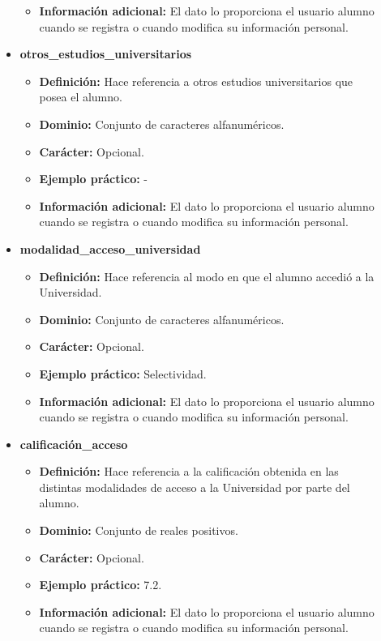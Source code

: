 \begin{description}
\begin{itemize}
\begin{itemize}
         \item \textbf{Información adicional:} El dato lo proporciona el usuario alumno cuando se registra o cuando modifica su información personal.
      \end{itemize}
   \item \textbf{otros\_estudios\_universitarios}
      \begin{itemize}
         \item \textbf{Definición:} Hace referencia a otros estudios universitarios que posea el alumno.
         \item \textbf{Dominio:} Conjunto de caracteres alfanuméricos.
         \item \textbf{Carácter:}  Opcional.
         \item \textbf{Ejemplo práctico:} -
         \item \textbf{Información adicional:} El dato lo proporciona el usuario alumno cuando se registra o cuando modifica su información personal.
      \end{itemize}
   \item \textbf{modalidad\_acceso\_universidad}
      \begin{itemize}
         \item \textbf{Definición:} Hace referencia al modo en que el alumno accedió a la Universidad.
         \item \textbf{Dominio:} Conjunto de caracteres alfanuméricos.
         \item \textbf{Carácter:}  Opcional.
         \item \textbf{Ejemplo práctico:} Selectividad.
         \item \textbf{Información adicional:} El dato lo proporciona el usuario alumno cuando se registra o cuando modifica su información personal.
      \end{itemize}
   \item \textbf{calificación\_acceso}
      \begin{itemize}
         \item \textbf{Definición:} Hace referencia a la calificación obtenida en las distintas modalidades de acceso a la Universidad por parte del alumno.
         \item \textbf{Dominio:} Conjunto de reales positivos.
         \item \textbf{Carácter:}  Opcional.
         \item \textbf{Ejemplo práctico:} 7.2.
         \item \textbf{Información adicional:} El dato lo proporciona el usuario alumno cuando se registra o cuando modifica su información personal.
      \end{itemize}
   \end{itemize}


\end{description}
